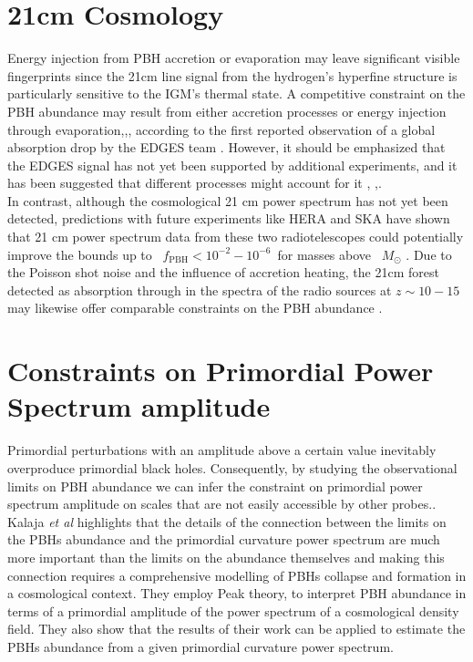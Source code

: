 \section{21cm Cosmology}
Energy injection from PBH accretion or evaporation may leave significant visible fingerprints since the 21cm line signal from the hydrogen's hyperfine structure is particularly sensitive to the IGM's thermal state. A competitive constraint on the PBH abundance may result from either accretion processes \cite{Hektor:2018qqw} or energy injection through evaporation\cite{Clark:2016nst},\cite{Halder:2021jiv},\cite{Halder:2021rbq}, according to the first reported observation of a global absorption drop by the EDGES team \cite{Bowman:2018yin}. However, it should be emphasized that the EDGES signal has not yet been supported by additional experiments, and it has been suggested that different processes might account for it \cite{Hills:2018vyr}, \cite{Bradley:2018eev},\cite{2020MNRAS.492...22S}.\\
In contrast, although the cosmological 21 cm power spectrum has not yet been detected, predictions with future experiments like HERA and SKA have shown that 21 cm power spectrum data from these two radiotelescopes could potentially improve the bounds up to  $ f_{\mathrm{PBH}} < 10^{-2} - 10^{-6}$ for masses above  $M_{\odot}$ \cite{Mena:2019nhm}. Due to the Poisson shot noise and the influence of accretion heating, the 21cm forest detected as absorption through in the spectra of the radio sources at $z \sim 10-15$ may likewise offer comparable constraints on the PBH abundance \cite{Mena:2019nhm}.
\section{Constraints on Primordial Power Spectrum amplitude}
Primordial perturbations with an amplitude above a certain value inevitably overproduce primordial black holes. Consequently, by studying the observational limits on PBH abundance we can infer the constraint on primordial power spectrum amplitude on scales that are not easily accessible by other probes.\cite{Sato-Polito:2019hws, Mifsud:2019xpu, Kalaja:2019uju}.\\

Kalaja \emph{et al} \cite{Kalaja:2019uju} highlights that the details of the connection between the limits on the PBHs abundance and the primordial curvature power spectrum are much more important
than the limits on the abundance themselves and making this connection requires a comprehensive modelling of PBHs collapse and formation in a cosmological context. They employ Peak theory, to interpret PBH abundance in
terms of a primordial amplitude of the power spectrum of a cosmological density field. They also show that the results of their work \cite{Kalaja:2019uju} can be applied to estimate the PBHs abundance from a given primordial curvature
power spectrum.

